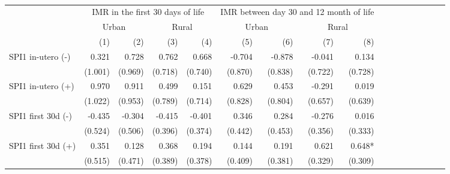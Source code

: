 \begin{table}[H]
\centering
\caption{}
\label{table4}
\begin{adjustbox}{max width=\linewidth}
\begin{tabular}{lrrrrrrrrrrrrrrrr}
\toprule
                                            &      \multicolumn{4}{c}{IMR in the first 30 days of life}     &   \multicolumn{4}{c}{IMR between day 30 and 12 month of life}      \\ 
\cmidrule(lr){2-5} \cmidrule(lr){6-9} \cmidrule(lr){10-13} \cmidrule(lr){14-17} 
                                            &      \multicolumn{2}{c}{Urban} &      \multicolumn{2}{c}{Rural}     &  \multicolumn{2}{c}{Urban} &      \multicolumn{2}{c}{Rural}      \\ 
\cmidrule(lr){2-5} \cmidrule(lr){6-9} \cmidrule(lr){10-13} \cmidrule(lr){14-17} 
                                            &        (1) &        (2) &        (3) &        (4) &       (5) &       (6) &       (7) &       (8)  \\ 
\midrule 
SPI1 in-utero  (-)                           &        0.321 &       0.728 &       0.762 &       0.668  &       -0.704 &       -0.878  &        -0.041 &        0.134 \\
                                             &      (1.001) &     (0.969) &     (0.718) &     (0.740)  &      (0.870) &      (0.838)  &       (0.722) &      (0.728) \\
SPI1 in-utero  (+)                           &        0.970 &       0.911 &       0.499 &       0.151  &        0.629 &        0.453  &        -0.291 &        0.019 \\
                                             &      (1.022) &     (0.953) &     (0.789) &     (0.714)  &      (0.828) &      (0.804)  &       (0.657) &      (0.639) \\
SPI1 first 30d  (-)                          &       -0.435 &      -0.304 &      -0.415 &      -0.401  &        0.346 &        0.284  &        -0.276 &        0.016 \\
                                             &      (0.524) &     (0.506) &     (0.396) &     (0.374)  &      (0.442) &      (0.453)  &       (0.356) &      (0.333) \\
SPI1 first 30d  (+)                          &        0.351 &       0.128 &       0.368 &       0.194  &        0.144 &        0.191  &         0.621 &       0.648* \\
                                             &      (0.515) &     (0.471) &     (0.389) &     (0.378)  &      (0.409) &      (0.381)  &       (0.329) &      (0.309) \\

\end{tabular}
\end{adjustbox}
\end{table}

